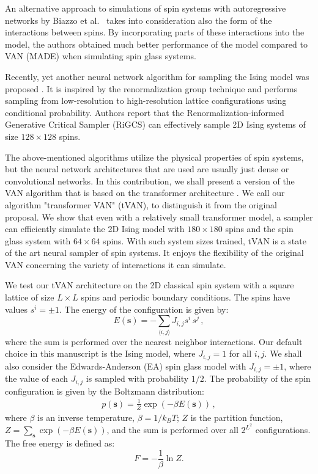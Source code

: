 \documentclass[3p, times,merge]{elsarticle}
\begin{document}
An alternative approach to simulations of spin systems with autoregressive networks by Biazzo et al.~\cite{Biazzo_2023,2024MLS&T...5b5074B} takes into consideration also the form of the interactions between spins. By incorporating parts of these interactions into the model, the authors obtained much better performance of the model compared to VAN (MADE) when simulating spin glass systems. 

Recently, yet another neural network algorithm for sampling the Ising model was proposed \cite{Singha:2025lsd}. It is inspired by the renormalization group technique and performs sampling from low-resolution to high-resolution lattice configurations using conditional probability. Authors report that the Renormalization-informed Generative Critical Sampler (RiGCS) can effectively sample 2D Ising systems of size $128\times 128$ spins. 

The above-mentioned algorithms utilize the physical properties of spin systems, but the neural network architectures that are used are usually just dense or convolutional networks. In this contribution, we shall present a version of the VAN algorithm that is based on the transformer architecture \cite{NIPS2017_3f5ee243}. We call our algorithm "transformer VAN" (tVAN), to distinguish it from the original proposal. We show that even with a relatively small transformer model, a sampler can efficiently simulate the 2D Ising model with $180\times 180$ spins and the spin glass system with $64 \times 64$ spins. With such system sizes trained, tVAN is a state of the art neural sampler of spin systems. It enjoys the flexibility of the original VAN concerning the variety of interactions it can simulate.

We test our tVAN architecture on the 2D classical spin system with a square lattice of size $L\times L$ spins and periodic boundary conditions. The spins have values $s^i=\pm 1$. The energy of the configuration is given by:
\begin{equation}
    E(\mathbf{s}) = -  \sum_{\langle i,j \rangle} J_{i,j} s^i \, s^j \,,
\label{spin_hamilt}
\end{equation}
where the sum is performed over the nearest neighbor interactions. Our default choice in this manuscript is the Ising model, where $J_{i,j}=1$ for all $i,j$. We shall also consider the Edwards-Anderson (EA) spin glass model with $J_{i,j}=\pm 1$, where the value of each $J_{i,j}$ is sampled with probability $1/2$. The probability of the spin configuration is given by the Boltzmann distribution:
\begin{align}
    p(\mathbf{s}) = \frac{1}{Z} \exp(-\beta E(\mathbf{s})) \,,
    \label{eq_boltz_distr}
\end{align}
where $\beta$ is an inverse temperature, $\beta=1/k_BT$; $Z$ is the partition function, $Z=\sum_{\mathbf{s}} \exp(-\beta E(\mathbf{s}))$, and the sum is performed over all $2^{L^2}$ configurations. The free energy is defined as:
\begin{equation}
F= -\frac{1}{\beta} \ln Z.
\label{F_def_eq}
\end{equation}
\end{document}
